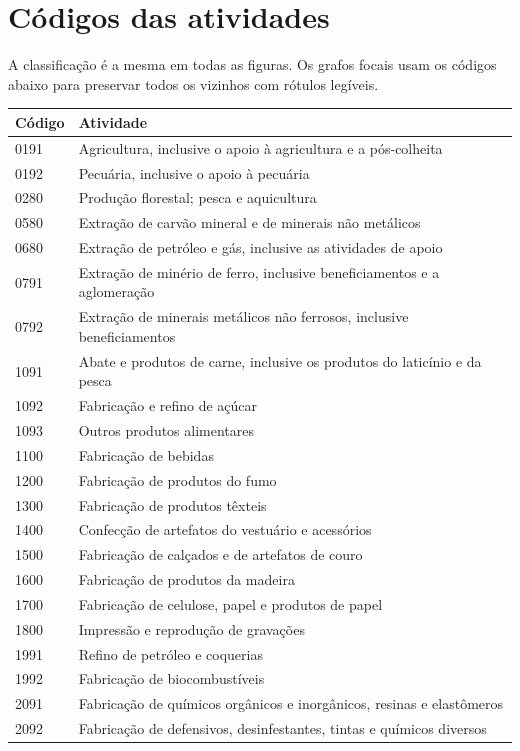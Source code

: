 \section{Códigos das atividades}
A classificação é a mesma em todas as figuras. Os grafos focais usam os códigos abaixo para preservar todos os vizinhos com rótulos legíveis.
\small
\begin{longtable}{@{}lp{}@{}}
\toprule Código & Atividade\\\midrule\endhead
0191 & Agricultura, inclusive o apoio à agricultura e a pós-colheita \\
0192 & Pecuária, inclusive o apoio à pecuária \\
0280 & Produção florestal; pesca e aquicultura \\
0580 & Extração de carvão mineral e de minerais não metálicos \\
0680 & Extração de petróleo e gás, inclusive as atividades de apoio \\
0791 & Extração de minério de ferro, inclusive beneficiamentos e a aglomeração \\
0792 & Extração de minerais metálicos não ferrosos, inclusive beneficiamentos \\
1091 & Abate e produtos de carne, inclusive os produtos do laticínio e da pesca \\
1092 & Fabricação e refino de açúcar \\
1093 & Outros produtos alimentares \\
1100 & Fabricação de bebidas \\
1200 & Fabricação de produtos do fumo \\
1300 & Fabricação de produtos têxteis \\
1400 & Confecção de artefatos do vestuário e acessórios \\
1500 & Fabricação de calçados e de artefatos de couro \\
1600 & Fabricação de produtos da madeira \\
1700 & Fabricação de celulose, papel e produtos de papel \\
1800 & Impressão e reprodução de gravações \\
1991 & Refino de petróleo e coquerias \\
1992 & Fabricação de biocombustíveis \\
2091 & Fabricação de químicos orgânicos e inorgânicos, resinas e elastômeros \\
2092 & Fabricação de defensivos, desinfestantes, tintas e químicos diversos \\

\end{longtable}
